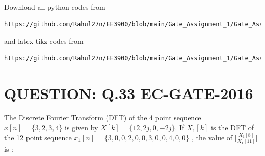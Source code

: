 \documentclass[journal,12pt,twocolumn]{IEEEtran}
\begin{document}
Download all python codes from 
\begin{lstlisting}
https://github.com/Rahul27n/EE3900/blob/main/Gate_Assignment_1/Gate_Assignment_1.py
\end{lstlisting}
%
and latex-tikz codes from 
%
\begin{lstlisting}
https://github.com/Rahul27n/EE3900/blob/main/Gate_Assignment_1/Gate_Assignment_1.tex
\end{lstlisting}

\vspace{0.5cm}
\section{QUESTION: Q.33 EC-GATE-2016}

The Discrete Fourier Transform (DFT) of the 4 point sequence $ x[n] =\{3, 2, 3, 4\}$ is given by $ X[k] =\{12, 2j, 0, -2j\}$. If $X_{1}[k]$ is the DFT of the 12 point sequence $ x_{1}[n] =\{3, 0, 0, 2, 0, 0, 3, 0, 0, 4, 0, 0\}$ , the value of $\big|{\frac{X_{1}[8]}{X_{1}[11]}}\big|$ is :
\end{document}
